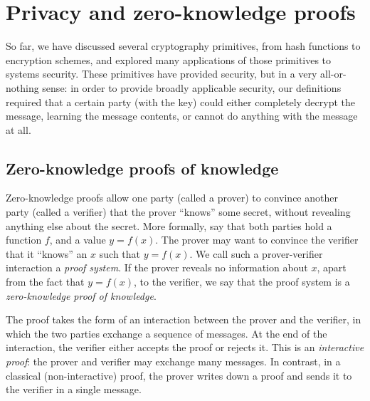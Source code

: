\chapter{Privacy and zero-knowledge proofs}

So far, we have discussed several cryptography primitives, from hash
functions to encryption schemes, and explored many applications of those
primitives to systems security.  These primitives have provided security,
but in a very all-or-nothing sense: in order to provide broadly applicable
security, our definitions required that a certain party (with the key)
could either completely decrypt the message, learning the message
contents, or cannot do anything with the message at all.

\section{Zero-knowledge proofs of knowledge}

Zero-knowledge proofs allow one party (called a prover) to convince
another party (called a verifier) that the prover ``knows'' some secret,
without revealing anything else about the secret.
More formally, say that both parties hold a function $f$, and a value $y = f(x)$.
The prover may want to convince the verifier that it ``knows'' an $x$ such that
$y=f(x)$.
We call such a prover-verifier interaction a \emph{proof system}.
If the prover reveals no information about $x$, apart from the fact that $y=f(x)$,
to the verifier, we say that the proof system is a \emph{zero-knowledge proof of knowledge}.

The proof takes the form of an interaction
between the prover and the verifier, in which
the two parties exchange a sequence of messages.
At the end of the interaction, the verifier either
accepts the proof or rejects it.
This is an \emph{interactive proof}: the prover and
verifier may exchange many messages.
In contrast, in a classical (non-interactive) proof,
the prover writes down a proof and sends it to the verifier in a single message.

